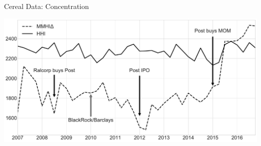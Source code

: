 \documentclass[handout, serif, aspectratio=169, 10pt]{beamer}
\begin{document}
\begin{frame}[plain]{Cereal Data: Concentration}
\begin{center}
\includegraphics[height = 0.9\textheight ]{figures/all_mhhi_hhi.pdf}
\end{center}
\end{frame}
\end{document}

